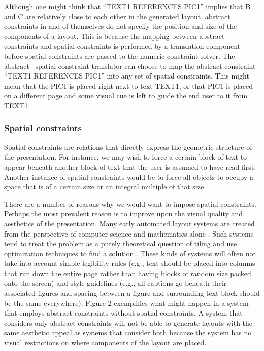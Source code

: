 		Although one might think that “TEXT1 REFERENCES PIC1” implies that B and C
		are relatively close to each other in the generated layout, abstract
		constraints in and of themselves do not specify the position and size of
		the components of a layout. This is because the mapping between abstract
		constraints and spatial constraints is performed by a translation component
		before spatial constraints are passed to the numeric constraint solver. The
		abstract– spatial constraint translator can choose to map the abstract
		constraint “TEXT1 REFERENCES PIC1” into any set of spatial constraints.
		This might mean that the PIC1 is placed right next to text TEXT1, or that
		PIC1 is placed on a different page and some visual cue is left to guide the
		end user to it from TEXT1.

    \subsubsection{Spatial constraints}
		\label{spatialcon}

		Spatial constraints are relations that directly express the geometric
		structure of the presentation. For instance, we may wish to force a certain
		block of text to appear beneath another block of text that the user is
		assumed to have read first. Another instance of spatial constraints would
		be to force all objects to occupy a space that is of a certain size or an
		integral multiple of that size.

		There are a number of reasons why we would want to impose spatial
		constraints. Perhaps the most prevalent reason is to improve upon the
		visual quality and aesthetics of the presentation. Many early automated
		layout systems are created from the perspective of computer science and
		mathematics alone \citep{beach-1}. Such systems tend to treat the problem
		as a purely theoretical question of tiling and use optimization techniques
		to find a solution \citep{luders-1}. These kinds of systems will often not
		take into account simple legibility rules (e.g., text should be placed into
		columns that run down the entire page rather than having blocks of random
		size packed onto the screen) and style guidelines (e.g., all captions go
		beneath their associated figures and spacing between a figure and
		surrounding text block should be the same everywhere). Figure 2 exemplifies
		what might happen in a system that employs abstract constraints without
		spatial constraints. A system that considers only abstract constraints will
		not be able to generate layouts with the same aesthetic appeal as systems
		that consider both because the system has no visual restrictions on where
		components of the layout are placed.

